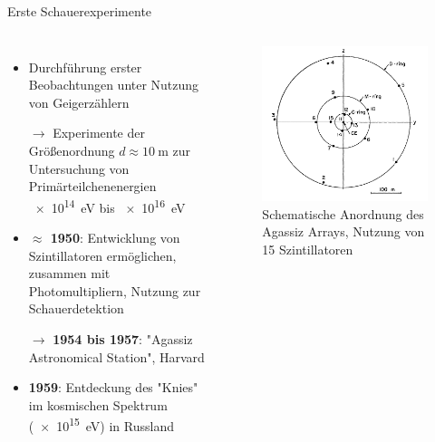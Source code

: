 \documentclass[aspectratio=1610, professionalfonts, 9pt, hyperref={colorlinks=false}]{beamer}
\begin{document}
\begin{frame}{Erste Schauerexperimente}
  \begin{columns}
      \begin{itemize}
        \setlength\itemsep{0.5em}
        \item Durchführung erster Beobachtungen unter Nutzung von Geigerzählern
        \item[$\rightarrow$] Experimente der Größenordnung $d \approx \SI{10}{\metre}$ zur Untersuchung von Primärteilchenenergien \SI{e14}{\electronvolt} bis \SI{e16}{\electronvolt}
        \item \textbf{$\approx$ 1950}: Entwicklung von Szintillatoren ermöglichen, zusammen mit Photomultipliern, Nutzung zur Schauerdetektion
        \item[$\rightarrow$] \textbf{1954 bis 1957}: "Agassiz Astronomical Station", Harvard
        \item \textbf{1959}: Entdeckung des "Knies" im kosmischen Spektrum (\SI{e15}{\electronvolt}) in Russland
      \end{itemize}
        \vspace*{10px}
  
      \begin{figure}
          \centering
          \includegraphics[width=0.7\linewidth]{images/AGASSIZ}
          \caption{Schematische Anordnung des Agassiz Arrays, Nutzung von 15 Szintillatoren \cite{9789400754225}}
      \end{figure}
  \end{columns}
\end{frame}
\end{document}
